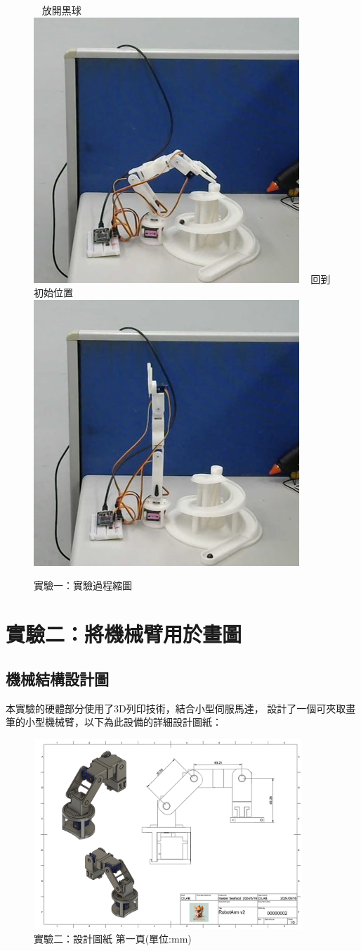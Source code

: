 \documentclass[class=NCU_thesis, crop=false]{standalone}
\begin{document}
\begin{figure}[h]
    ~    
    \subcaptionbox
        {放開黑球
        \label{fig:fig-dataset-contrast-after-adjustment}}
        {\includegraphics[width=0.4\linewidth]{figures/TB (5).jpg}}
    ~
    \subcaptionbox
        {回到初始位置
        \label{fig:fig-dataset-contrast-after-adjustment}}
        {\includegraphics[width=0.4\linewidth]{figures/TB (6).jpg}}   
\caption{實驗一：實驗過程縮圖}
\end{figure}

\section{實驗二：將機械臂用於畫圖}
\subsection{機械結構設計圖}
本實驗的硬體部分使用了3D列印技術，結合小型伺服馬達，
設計了一個可夾取畫筆的小型機械臂，以下為此設備的詳細設計圖紙：
\begin{figure}[htbp]
    \centering
    \includegraphics[width=0.9\textwidth]{figures/Armv2 (1).PNG}
    \caption{實驗二：設計圖紙 第一頁(單位:mm)}
\end{figure}
\end{document}
